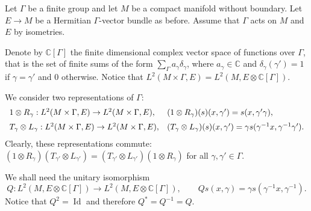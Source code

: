 \documentclass[11pt,a4paper]{amsart}
\newcommand{\C}{\mathbb C}
\newcommand\<{\langle}
\renewcommand\>{\rangle}
\newcommand{\oid}{\operatorname{Id}}
\theoremstyle{definition}
\begin{document}
Let   $\Gamma$ be a finite group and let $M$ be a compact manifold without boundary.
Let $E \rightarrow M$ be a Hermitian $\Gamma$-vector bundle as before.
Assume that $\Gamma $ acts on $M$ and $E$ by isometries.
%

Denote by $\C[\Gamma]$ the finite dimensional complex vector space of functions over $\Gamma$, 
that is the set of finite sums of the form $\sum_\Gamma a_\gamma \delta_\gamma$,
where $a_\gamma \in \C$ and $\delta_\gamma(\gamma')=1$ if $\gamma=\gamma'$ and $0$ otherwise. 
Notice that $L^2(M \times \Gamma,E)=L^2(M,E\otimes \C[\Gamma])$.

We consider two representations of $\Gamma$:
$$
 \begin{array}{ll}
 1 \otimes R_\gamma : L^2(M\times \Gamma ,E) \rightarrow L^2(M\times  \Gamma ,E), & (1\otimes R_\gamma )(s) (x,\gamma')=s(x,\gamma'\gamma),\vspace{2mm}\\
 T_\gamma \otimes L_\gamma : L^2(M\times \Gamma ,E) \rightarrow L^2(M\times  \Gamma ,E) ,& (T_\gamma\otimes L_\gamma) (s) (x,\gamma')=\gamma s(\gamma^{-1}x,\gamma^{-1}\gamma').
\end{array} 
$$
Clearly, these  representations commute: $( 1 \otimes R_\gamma )( T_{\gamma'} \otimes L_{\gamma'} ) = ( T_{\gamma'} \otimes L_{\gamma'} ) ( 1 \otimes R_\gamma )$ for all $\gamma,\gamma'\in\Gamma$.

We shall need the unitary isomorphism
\begin{equation}
Q : L^2 (M,E \otimes \C[\Gamma]) \rightarrow L^2(M,E\otimes \C[\Gamma]),\qquad Qs(x,\gamma)=\gamma s(\gamma^{-1}x,\gamma^{-1}).
\end{equation}
Notice that $Q^2=\oid$ and therefore $Q^*=Q^{-1}=Q$.
\end{document}
